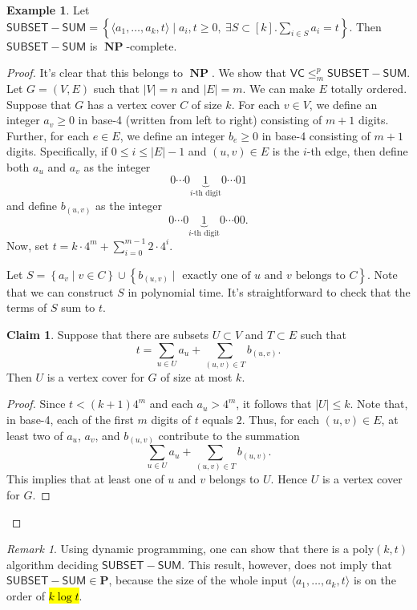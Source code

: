 \documentclass[10pt,letterpaper,cm]{nupset}
\theoremstyle{definition}
\newtheorem{exmp}[definition]{Example}
\theoremstyle{theorem}
\newtheorem*{claim}{Claim}
\theoremstyle{remark}
\newtheorem{remark}[definition]{Remark}
\newcommand{\1}{\mathbf{1}}
\newcommand{\0}{\vec 0}
\DeclareMathOperator{\NP}{\mathbf{NP}}
\begin{document}
\begin{exmp}
Let $\mathsf{SUBSET{-}SUM} = \left\{\langle a_1, \ldots, a_k, t\rangle \mid a_i,t\geq 0,\ \exists S \subset [k].\sum_{i\in S} a_i = t\right\}$. Then $\mathsf{SUBSET{-}SUM}$ is $\NP$-complete.
\end{exmp}
\begin{proof}
It's clear that this belongs to $\NP$. We show that $\mathsf{VC} \leq_m^p \mathsf{SUBSET{-}SUM}$. Let $G=\left(V, E\right)$ such that $\left\lvert{V}\right\rvert = n$ and $\left\lvert{E}\right\rvert= m$. We can make $E$ totally ordered. Suppose that $G$ has a vertex cover $C$ of size $k$. For each $v\in V$, we define an integer $a_v\geq 0$ in base-4 (written from left to right) consisting of $m+1$ digits. Further, for each $e\in E$, we define an integer $b_e\geq 0$ in base-4 consisting of $m+1$ digits. Specifically, if $0\leq i \leq \left\lvert{E}\right\rvert-1$ and  $\left(u,v\right) \in E$ is the $i$-th edge, then define both $a_u$ and $a_v$  as the integer $$0 \cdots 0 \underbrace{1}_{i\text{-th digit}} 0 \cdots 01   $$ and define $b_{(u,v)}$ as the integer $$0 \cdots 0 \underbrace{1}_{i\text{-th digit}} 0 \cdots 00     .$$ Now, set $t= k \cdot 4^m + \sum_{i=0}^{m-1}2 \cdot 4^i$.

\medskip

 Let $S = \left\{a_v \mid v\in C\right\} \cup \left\{b_{(u,v)} \mid\text{ exactly one of }u\text{ and }v\text{ belongs to }C\right\}$. Note that we can construct $S$ in polynomial time. It's straightforward to check that the terms of $S$ sum to $t$. 
\begin{claim}
Suppose that there are subsets $U\subset V$ and $T\subset E$ such that $$t= \sum_{u\in U}a_u +\sum_{(u,v) \in T} b_{(u,v)}.$$ Then $U$ is a vertex cover for $G$ of size at most $k$.
\end{claim}
\begin{proof}
Since $t<(k+1)4^m$ and each $a_u> 4^m$, it follows that $\left\lvert{U}\right\rvert\leq k$. Note that, in base-4, each of the first $m$ digits of $t$ equals $2$. Thus, for each $\left(u,v\right) \in E$, at least two of $a_u$, $a_v$, and $b_{(u,v)}$ contribute to the summation $$\sum_{u\in U}a_u +\sum_{(u,v) \in T} b_{(u,v)}.$$ This implies that at least one of $u$ and $v$ belongs to $U$. Hence $U$ is a vertex cover for $G$.
\end{proof}
\end{proof}

\begin{remark}
Using dynamic programming, one can show that there is a poly$\left(k, t\right)$ algorithm deciding $\mathsf{SUBSET{-}SUM}$. This result, however, does not imply that $\mathsf{SUBSET{-}SUM} \in \mathbf{P}$, because the size of the whole input $\langle a_1, \ldots, a_k, t\rangle$ is on the order of \hl{$k\log{t}$}.
\end{remark}
\end{document}
